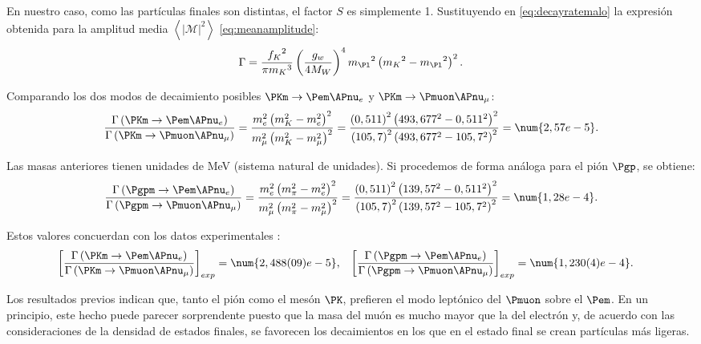 En nuestro caso, como las partículas finales son distintas, el factor $S$ es simplemente 1. Sustituyendo en \ref{eq:decayratemalo} la expresión obtenida para la amplitud media $\left\langle |\mathcal{M}|^{2}\right\rangle$ \ref{eq:meanamplitude}:
\begin{equation}
\Gamma =\dfrac{{f_{K}}^{2}}{\pi {m_{K}}^{3}}\left( \dfrac{g_w}{4M_W}\right)^{4}{m_{\Pl}}^{2}\left({m_{K}}^{2}-{m_{\Pl}}^{2}\right)^{2} .\label{eq:decayratebueno}
\end{equation}

Comparando los dos modos de decaimiento posibles $\PKm \rightarrow \Pem \APnu_{e}$ y $\PKm \rightarrow \Pmuon \APnu_{\mu}$:
\begin{equation}
\dfrac{\Gamma \left( \PKm \rightarrow \Pem \APnu_{e}\right) }{\Gamma \left( \PKm \rightarrow \Pmuon \APnu_{\mu}\right) }=\dfrac{m_{e}^{2}\left( m_{K}^{2}-m_{e}^{2}\right) ^{2}}{m_{\mu }^{2}\left( m_{K}^{2}-m_{\mu }^{2}\right) ^{2}}=\dfrac{\left( 0,511\right) ^{2}\left( 493,677^{2}-0,511^{2}\right) ^{2}}{\left( 105,7\right) ^{2}\left( 493,677^{2}-105,7^{2}\right) ^{2}}=\num{2,57e-5}.\label{eq:BRkaon}
\end{equation}

Las masas anteriores tienen unidades de MeV (sistema natural de unidades). Si procedemos de forma análoga para el pión $\Pgp$, se obtiene:
\begin{equation}
\dfrac{\Gamma \left( \Pgpm \rightarrow \Pem \APnu_{e}\right) }{\Gamma \left( \Pgpm \rightarrow \Pmuon \APnu_{\mu}\right) }=\dfrac{m_{e}^{2}\left( m_{\pi}^{2}-m_{e}^{2}\right) ^{2}}{m_{\mu }^{2}\left( m_{\pi}^{2}-m_{\mu }^{2}\right) ^{2}}=\dfrac{\left( 0,511\right) ^{2}\left(139,57^{2}-0,511^{2}\right) ^{2}}{\left( 105,7\right) ^{2}\left( 139,57^{2}-105,7^{2}\right) ^{2}}=\num{1,28e-4}.\label{eq:BRpion}
\end{equation}

Estos valores concuerdan con los datos experimentales \cite{tanabashi} \cite{olive}:
\begin{align}
\left[\dfrac{\Gamma \left( \PKm \rightarrow \Pem \APnu_{e}\right)}{\Gamma \left( \PKm \rightarrow \Pmuon \APnu_{\mu}\right)}\right]_{exp} &= \num{2,488(09)e-5}, & \left[\dfrac{\Gamma \left( \Pgpm \rightarrow \Pem \APnu_{e}\right)}{\Gamma \left( \Pgpm \rightarrow \Pmuon \APnu_{\mu}\right)}\right]_{exp} &= \num{1,230(4)e-4}.\label{eq:BRexp}
\end{align}

Los resultados previos indican que, tanto el pión como el mesón $\PK$, prefieren el modo leptónico del $\Pmuon$ sobre el $\Pem$. En un principio, este hecho puede parecer sorprendente puesto que la masa del muón es mucho mayor que la del electrón y, de acuerdo con las consideraciones de la densidad de estados finales, se favorecen los decaimientos en los que en el estado final se crean partículas más ligeras.  


